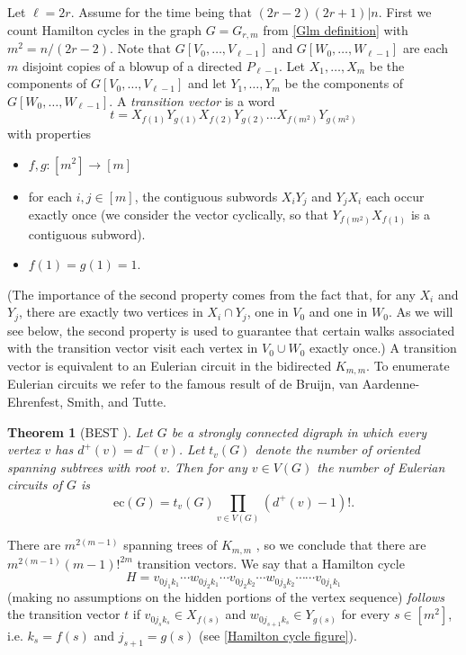 \documentclass[12pt]{article}
\newtheorem{thm}{Theorem}
\begin{document}
    Let $\ell=2r$. Assume for the time being that $(2r-2)(2r+1)|n$. First we count Hamilton cycles in the graph $G=G_{r,m}$ from \autoref{Glm definition} with $m^2=n/(2r-2)$. Note that $G[V_0,\ldots,V_{\ell-1}]$ and $G[W_0,\ldots,W_{\ell-1}]$ are each $m$ disjoint copies of a blowup of a directed $P_{\ell-1}$. Let $X_1,\ldots,X_m$ be the components of $G[V_0,\ldots,V_{\ell-1}]$ and let $Y_1,\ldots,Y_m$ be the components of $G[W_0,\ldots,W_{\ell-1}]$.   A \textit{transition vector} is a word
$$t=X_{f(1)}Y_{g(1)}X_{f(2)}Y_{g(2)}\ldots X_{f(m^2)}Y_{g(m^2)}$$
with properties
\begin{itemize}
    \item $f,g:[m^2]\to[m]$
    \item for each $i,j\in[m]$, the contiguous subwords $X_iY_j$ and $Y_jX_i$ each occur exactly once (we consider the vector cyclically, so that $Y_{f(m^2)}X_{f(1)}$ is a contiguous subword).
    \item $f(1)=g(1)=1$.
\end{itemize}
(The importance of the second property comes from the fact that, for any $X_i$ and $Y_j$, there are exactly two vertices in $X_i\cap Y_j$, one in $V_0$ and one in $W_0$. As we will see below, the second property is used to guarantee that certain walks associated with the transition vector visit each vertex in $V_0\cup W_0$ exactly once.) A transition vector is equivalent to an Eulerian circuit in the bidirected $K_{m,m}$. To enumerate Eulerian circuits we refer to the famous result of de Bruijn, van Aardenne-Ehrenfest, Smith, and Tutte.
\begin{thm}[BEST \cite{van1987circuits}]
Let $G$ be a strongly connected digraph in which every vertex $v$ has $d^+(v)=d^-(v)$. Let $t_v(G)$ denote the number of oriented spanning subtrees with root $v$. Then for any $v\in V(G)$ the number of Eulerian circuits of $G$ is
$$\mathrm{ec}(G)=t_v(G)\prod_{v\in V(G)}(d^+(v)-1)!.$$
\end{thm}
There are $m^{2(m-1)}$ spanning trees of $K_{m,m}$ \cite{moh1990number}, so we conclude that there are $m^{2(m-1)}(m-1)!^{2m}$ transition vectors.
We say that a Hamilton cycle
$$H=v_{0j_1k_1}\cdots w_{0j_2k_1}\cdots v_{0j_2k_2}\cdots w_{0j_3k_2}\cdots\cdots v_{0j_1k_1}$$
(making no assumptions on the hidden portions of the vertex sequence) \textit{follows} the transition vector $t$ if $v_{0j_sk_s}\in X_{f(s)}$ and $w_{0j_{s+1}k_s}\in Y_{g(s)}$ for every $s\in[m^2]$, i.e. $k_s=f(s)$ and $j_{s+1}=g(s)$ (see \autoref{Hamilton cycle figure}).
\end{document}
